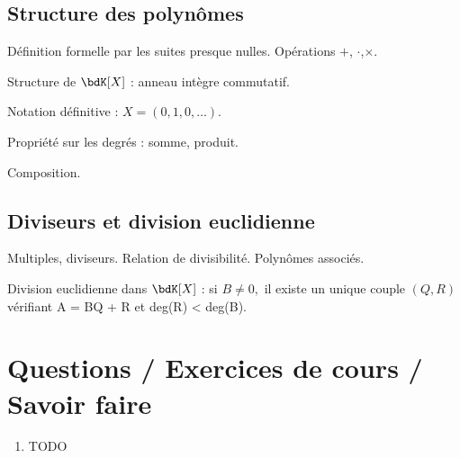 \documentclass[a4paper,french,bookmarks]{article}
\begin{document}
\subsection{Structure des polynômes}

\begin{enumerate}
    \ithand Définition formelle par les suites presque nulles. Opérations $+$, $\cdot$,$\times$.
    
    \ithand Structure de $\bdK[X]$ : anneau intègre commutatif.
    
    \ithand Notation définitive : $X = (0, 1, 0, \dots)$.
    
    \ithand Propriété sur les degrés : somme, produit.
    
    \ithand Composition.
\end{enumerate}

\subsection{Diviseurs et division euclidienne}

\begin{enumerate}
    \ithand Multiples, diviseurs. Relation de divisibilité. Polynômes associés.
    
    \ithand Division euclidienne dans $\bdK[X]$ : si $B \neq 0,$ il existe un unique couple $(Q,R)$ vérifiant A = BQ + R et deg(R) < deg(B).
\end{enumerate}

\section*{Questions / Exercices de cours / Savoir faire}

\begin{enumerate}
    \item TODO
\end{enumerate}
\end{document}
